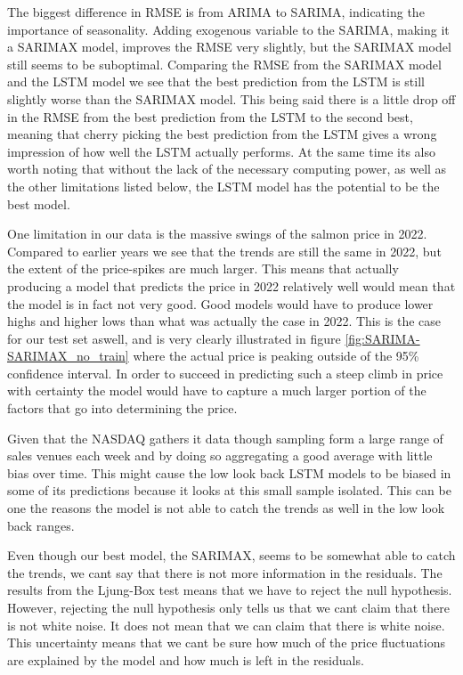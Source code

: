 The biggest difference in RMSE is from ARIMA to SARIMA, indicating the importance of seasonality. Adding exogenous variable to the SARIMA, making it a SARIMAX model, improves the RMSE very slightly, but the SARIMAX model still seems to be suboptimal. Comparing the RMSE from the SARIMAX model and the LSTM model we see that the best prediction from the LSTM is still slightly worse than the SARIMAX model. This being said there is a little drop off in the RMSE from the best prediction from the LSTM to the second best, meaning that cherry picking the best prediction from the LSTM gives a wrong impression of how well the LSTM actually performs. At the same time its also worth noting that without the lack of the necessary computing power, as well as the other limitations listed below, the LSTM model has the potential to be the best model.

One limitation in our data is the massive swings of the salmon price in 2022. Compared to earlier years we see that the trends are still the same in 2022, but the extent of the price-spikes are much larger. This means that actually producing a model that predicts the price in 2022 relatively well would mean that the model is in fact not very good. Good models would have to produce lower highs and higher lows than what was actually the case in 2022. This is the case for our test set aswell, and is very clearly illustrated in figure \ref{fig:SARIMA-SARIMAX_no_train} where the actual price is peaking outside of the 95\% confidence interval. In order to succeed in predicting such a steep climb in price with certainty the model would have to capture a much larger portion of the factors that go into determining the price.

Given that the NASDAQ gathers it data though sampling form a large range of sales venues each week and by doing so aggregating a good average with little bias over time. This might cause the low look back LSTM models to be biased in some of its predictions because it looks at this small sample isolated. This can be one the reasons the model is not able to catch the trends as well in the low look back ranges. 

Even though our best model, the SARIMAX, seems to be somewhat able to catch the trends, we cant say that there is not more information in the residuals. The results from the Ljung-Box test means that we have to reject the null hypothesis. However, rejecting the null hypothesis only tells us that we cant claim that there is not white noise. It does not mean that we can claim that there is white noise. This uncertainty means that we cant be sure how much of the price fluctuations are explained by the model and how much is left in the residuals. 


